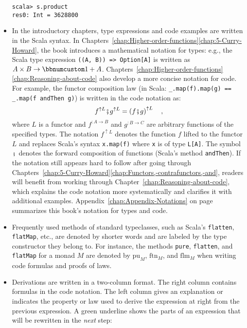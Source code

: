 \begin{itemize}
\begin{lstlisting}[mathescape=true]
scala> s.product
res0: Int = 3628800 
\end{lstlisting}
\item In the introductory chapters, type expressions and code examples are
written in the Scala syntax. In Chapters~\ref{chap:Higher-order-functions}\textendash \ref{chap:5-Curry-Howard},
the book introduces a mathematical notation for types: e.g., the Scala
type expression \lstinline!((A, B)) => Option[A]! is written as $A\times B\rightarrow\bbnum 1+A$.
Chapters~\ref{chap:Higher-order-functions}\textendash \ref{chap:Reasoning-about-code}
also develop a more concise notation for code. For example, the functor
composition law (in Scala: \lstinline!_.map(f).map(g) == _.map(f andThen g)!)
is written in the code notation as:
\[
f^{\uparrow L}\bef g^{\uparrow L}=\left(f\bef g\right)^{\uparrow L}\quad,
\]
where $L$ is a functor and $f^{:A\rightarrow B}$ and $g^{:B\rightarrow C}$
are arbitrary functions of the specified types. The notation $f^{\uparrow L}$
denotes the function $f$ lifted to the functor $L$ and replaces
Scala\textsf{'}s syntax \lstinline!x.map(f)! where \lstinline!x! is of type
\lstinline!L[A]!. The symbol $\bef$ denotes the forward composition
of functions (Scala\textsf{'}s method \lstinline!andThen!). If the notation
still appears hard to follow after going through Chapters~\ref{chap:5-Curry-Howard}\textendash \ref{chap:Functors,-contrafunctors,-and},
readers will benefit from working through Chapter~\ref{chap:Reasoning-about-code},
which explains the code notation more systematically and clarifies
it with additional examples. Appendix~\ref{chap:Appendix-Notations}
on page~\pageref{chap:Appendix-Notations} summarizes this book\textsf{'}s
notation for types and code.
\item Frequently used methods of standard typeclasses, such as Scala\textsf{'}s \lstinline!flatten!,
\lstinline!flatMap!, etc., are denoted by shorter words and are labeled
by the type constructor they belong to. For instance, the methods
\lstinline!pure!, \lstinline!flatten!, and \lstinline!flatMap!
for a monad $M$ are denoted by $\text{pu}_{M}$, $\text{ftn}_{M}$,
and $\text{flm}_{M}$ when writing code formulas and proofs of laws.
\item Derivations are written in a two-column format. The right column contains
formulas in the code notation. The left column gives an explanation
or indicates the property or law used to derive the expression at
right from the previous expression. A green underline shows the parts
of an expression that will be rewritten in the \emph{next} step:

\end{itemize}
